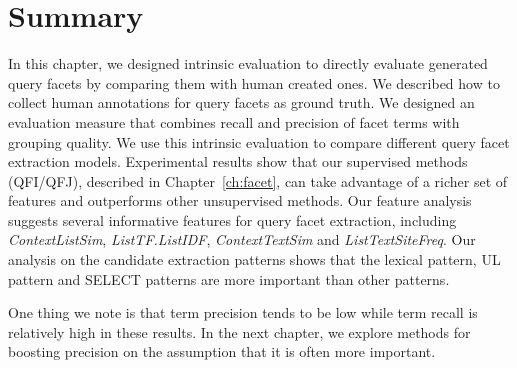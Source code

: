 
\section{Summary} \label{sec:ie-conclusions}
In this chapter, we designed intrinsic evaluation to directly evaluate generated query facets by comparing them with human created ones. We described how to collect human annotations for query facets as ground truth. We designed an evaluation measure that combines recall and precision of facet terms with grouping quality. We use this intrinsic evaluation to compare different query facet extraction models. Experimental results show that our supervised methods (QFI/QFJ), described in Chapter~\ref{ch:facet}, can take advantage of a richer set of features and outperforms other unsupervised methods. Our feature analysis suggests several informative features for query facet extraction, including \textit{ContextListSim}, \textit{ListTF.ListIDF}, \textit{ContextTextSim} and \textit{ListTextSiteFreq}. Our analysis on the candidate extraction patterns shows that the lexical pattern, UL pattern and SELECT patterns are more important than other patterns.


One thing we note is that term precision tends to be low while term recall is relatively high in these results. In the next chapter, we explore methods for boosting precision on the assumption that it is often more important.

